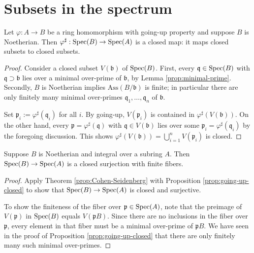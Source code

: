 \section{Subsets in the spectrum}
\begin{proposition}\label{prop:going-up-closed}
	Let $\varphi: A \to B$ be a ring homomorphism with going-up property and suppose $B$ is Noetherian. Then $\varphi^\sharp: \operatorname{Spec}(B) \to \operatorname{Spec}(A)$ is a closed map: it maps closed subsets to closed subsets.
\end{proposition}
\begin{proof}
	Consider a closed subset $V(\mathfrak{b})$ of $\operatorname{Spec}(B)$. First, every $\mathfrak{q} \in \operatorname{Spec}(B)$ with $\mathfrak{q} \supset \mathfrak{b}$ lies over a minimal over-prime of $\mathfrak{b}$, by Lemma \ref{prop:minimal-prime}. Secondly, $B$ is Noetherian implies $\text{Ass}(B/\mathfrak{b})$ is finite; in particular there are only finitely many minimal over-primes $\mathfrak{q}_1, \ldots, \mathfrak{q}_n$ of $\mathfrak{b}$.
	
	Set $\mathfrak{p}_i := \varphi^\sharp(\mathfrak{q}_i)$ for all $i$. By going-up, $V(\mathfrak{p}_i)$ is contained in $\varphi^\sharp(V(\mathfrak{b}))$. On the other hand, every $\mathfrak{p} = \varphi^\sharp(\mathfrak{q})$ with $\mathfrak{q} \in V(\mathfrak{b})$ lies over some $\mathfrak{p}_i = \varphi^\sharp(\mathfrak{q}_i)$ by the foregoing discussion. This shows $\varphi^\sharp(V(\mathfrak{b})) = \bigcup_{i=1}^n V(\mathfrak{p}_i)$ is closed.
\end{proof}

\begin{corollary}
	Suppose $B$ is Noetherian and integral over a subring $A$. Then $\operatorname{Spec}(B) \to \operatorname{Spec}(A)$ is a closed surjection with finite fibers.
\end{corollary}
\begin{proof}
	Apply Theorem \ref{prop:Cohen-Seidenberg} with Proposition \ref{prop:going-up-closed} to show that $\operatorname{Spec}(B) \to \operatorname{Spec}(A)$ is closed and surjective.

	To show the finiteness of the fiber over $\mathfrak{p} \in \operatorname{Spec}(A)$, note that the preimage of $V(\mathfrak{p})$ in $\operatorname{Spec}(B)$ equals $V(\mathfrak{p}B)$. Since there are no inclusions in the fiber over $\mathfrak{p}$, every element in that fiber must be a minimal over-prime of $\mathfrak{p}B$. We have seen in the proof of Proposition \ref{prop:going-up-closed} that there are only finitely many such minimal over-primes.
\end{proof}

